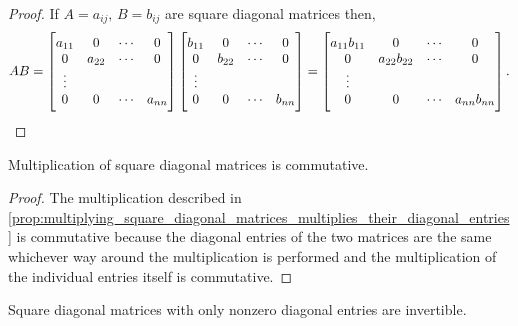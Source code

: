 \documentclass[../MathsNotesBase.tex]{subfiles}
\begin{document}
{		\medskip
		\begin{proof}
				If ${ A = a_{ij},\, B = b_{ij} }$ are square diagonal matrices then,
			\[  AB = 
				\begin{bmatrix}
				a_{11} & 0      & \cdots & 0\\
				0 	   & a_{22} & \cdots & 0\\
				\vdots\\
				0 	   & 0 	    & \cdots & a_{nn}
				\end{bmatrix}
				\begin{bmatrix}
				b_{11} & 0      & \cdots & 0\\
				0 	   & b_{22} & \cdots & 0\\
				\vdots\\
				0 	   & 0 	    & \cdots & b_{nn}
				\end{bmatrix} =
				\begin{bmatrix}
				a_{11}b_{11} & 0            & \cdots & 0\\
				0 	         & a_{22}b_{22} & \cdots & 0\\
				\vdots\\
				0 	         & 0 	        & \cdots & a_{nn}b_{nn}
				\end{bmatrix}. \qedhere
			\]
		\end{proof}
		\begin{corollary}
			\label{coro:multiplication_of_square_diagonal_matrices_is_commutative}
			Multiplication of square diagonal matrices is commutative.
		\end{corollary}
		\begin{proof}
			The multiplication described in \autoref{prop:multiplying_square_diagonal_matrices_multiplies_their_diagonal_entries} is commutative because the diagonal entries of the two matrices are the same whichever way around the multiplication is performed and the multiplication of the individual entries itself is commutative.
		\end{proof}
		\begin{corollary}
			\label{coro:square_diagonal_matrices_with_nonzero_diag_entries_invertible}
			Square diagonal matrices with only nonzero diagonal entries are invertible.

\end{corollary}}
\end{document}
